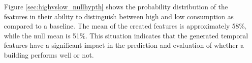 Figure \ref{sec:highvslow_nullhypth} shows the probability distribution of the features in their ability to distinguish between high and low consumption as compared to a baseline. The mean of the created features is approximately 58\%, while the null mean is 51\%. This situation indicates that the generated temporal features have a significant impact in the prediction and evaluation of whether a building performs well or not.